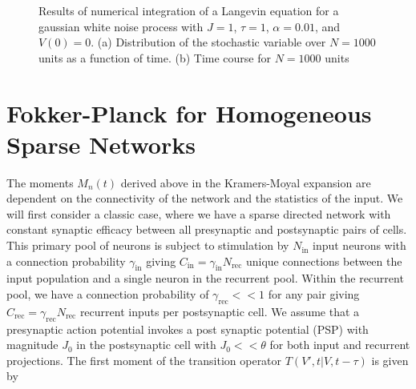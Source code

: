 \documentclass{ucetd}
\begin{document}
\begin{figure}
\centering
{}
\caption{Results of numerical integration of a Langevin equation for a gaussian white noise process with $J=1$, $\tau=1$, $\alpha=0.01$, and $V(0)=0$. (a) Distribution of the stochastic variable over $N=1000$ units as a function of time. (b) Time course for $N=1000$ units}
\end{figure}


\section{Fokker-Planck for Homogeneous Sparse Networks}

The moments $M_{n}(t)$ derived above in the Kramers-Moyal expansion are dependent on the connectivity of the network and the statistics of the input. We will first consider a classic case, where we have a sparse directed network with constant synaptic efficacy between all presynaptic and postsynaptic pairs of cells. This primary pool of neurons is subject to stimulation by $N_{\mathrm{in}}$ input neurons with a connection probability $\gamma_{\mathrm{in}}$ giving $C_{\mathrm{in}} = \gamma_{\mathrm{in}}N_{\mathrm{rec}}$ unique connections between the input population and a single neuron in the recurrent pool. Within the recurrent pool, we have a connection probability of $\gamma_{\mathrm{rec}} << 1$ for any pair giving $C_{\mathrm{rec}} = \gamma_{\mathrm{rec}} N_{\mathrm{rec}}$ recurrent inputs per postsynaptic cell. We assume that a presynaptic action potential invokes a post synaptic potential (PSP) with magnitude $J_{0}$ in the postsynaptic cell with $J_{0} << \theta$ for both input and recurrent projections. The first moment of the transition operator $T(V',t| V,t-\tau)$ is given by
\end{document}
